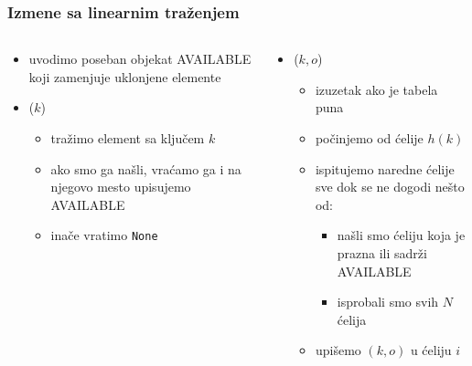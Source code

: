 \documentclass[compress,aspectratio=169]{beamer}
\begin{document}
\begin{frame}[fragile]
  \frametitle{Izmene sa linearnim traženjem}
  \begin{columns}
    \begin{column}[c]{6cm}
      \begin{itemize}
        \item uvodimo poseban objekat {\tiny AVAILABLE} koji zamenjuje uklonjene elemente
        \item {}($k$)
        \begin{itemize}
          \item tražimo element sa ključem $k$
          \item ako smo ga našli, vraćamo ga i na njegovo mesto upisujemo {\tiny AVAILABLE}
          \item inače vratimo \texttt{None}
        \end{itemize}
      \end{itemize}
    \end{column}
    \begin{column}[c]{6cm}
      \begin{itemize}
        \item {}($k, o$)
        \begin{itemize}
          \item izuzetak ako je tabela puna
          \item počinjemo od ćelije $h(k)$
          \item ispitujemo naredne ćelije sve dok se ne dogodi nešto od:
          \begin{itemize}
            \item našli smo ćeliju koja je prazna ili sadrži {\tiny AVAILABLE}
            \item isprobali smo svih $N$ ćelija
          \end{itemize}
          \item upišemo $(k, o)$ u ćeliju $i$
        \end{itemize}
      \end{itemize}
    \end{column}
  \end{columns}
\end{frame}
\end{document}
